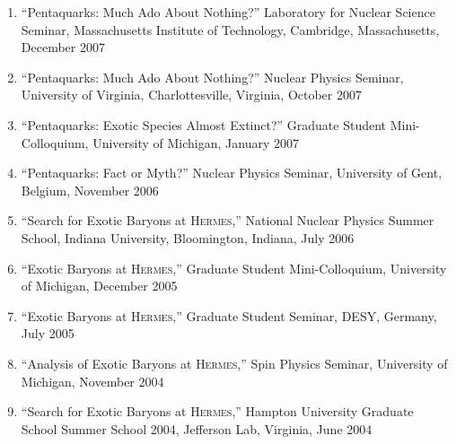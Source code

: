 \documentclass[overlapped,line,final,11pt,letterpaper]{res}
\begin{document}
\begin{resume}
\begin{enumerate}
\item ``Pentaquarks: Much Ado About Nothing?'' Laboratory for Nuclear Science Seminar, Massachusetts Institute of Technology, Cambridge, Massachusetts, December 2007
\item ``Pentaquarks: Much Ado About Nothing?'' Nuclear Physics Seminar, University of Virginia, Charlottesville, Virginia, October 2007
\item ``Pentaquarks: Exotic Species Almost Extinct?'' Graduate Student Mini-Colloquium, University of Michigan, January 2007
\item ``Pentaquarks: Fact or Myth?'' Nuclear Physics Seminar, University of Gent, Belgium, November 2006
\item ``Search for Exotic Baryons at \textsc{Hermes},'' National Nuclear Physics Summer School, Indiana University, Bloomington, Indiana, July 2006
\item ``Exotic Baryons at \textsc{Hermes},'' Graduate Student Mini-Colloquium, University of Michigan, December 2005
\item ``Exotic Baryons at \textsc{Hermes},'' Graduate Student Seminar, DESY, Germany, July 2005
\item ``Analysis of Exotic Baryons at \textsc{Hermes},'' Spin Physics Seminar, University of Michigan, November 2004
\item ``Search for Exotic Baryons at \textsc{Hermes},'' Hampton University Graduate School Summer School 2004, Jefferson Lab, Virginia, June 2004

\end{enumerate}


\end{resume}
\end{document}
